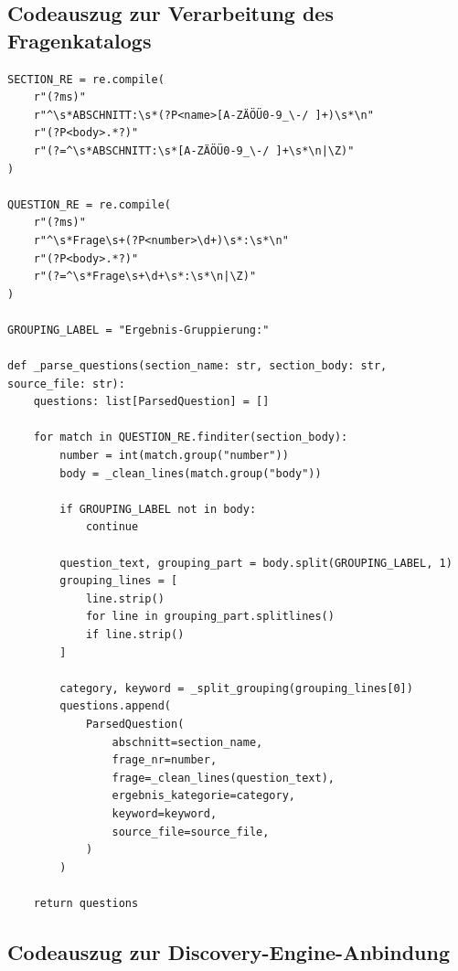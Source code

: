 \documentclass[
  10pt,
  ngerman,
  a4paper,
  toc=graduated,
  numbers=noenddot,
  headings=standardclasses,
  nonumberlist
]{scrartcl}
\begin{document}
\newpage
\subsection{Codeauszug zur Verarbeitung des Fragenkatalogs}
\label{anhang_fragen_parser}

\begin{lstlisting}[style=pythoncode, numbers=none, caption={Extraktion strukturierter Fragen aus dem Fragenkatalog}, label={lst:fragen_parser}]
SECTION_RE = re.compile(
    r"(?ms)"
    r"^\s*ABSCHNITT:\s*(?P<name>[A-ZÄÖÜ0-9_\-/ ]+)\s*\n"
    r"(?P<body>.*?)"
    r"(?=^\s*ABSCHNITT:\s*[A-ZÄÖÜ0-9_\-/ ]+\s*\n|\Z)"
)

QUESTION_RE = re.compile(
    r"(?ms)"
    r"^\s*Frage\s+(?P<number>\d+)\s*:\s*\n"
    r"(?P<body>.*?)"
    r"(?=^\s*Frage\s+\d+\s*:\s*\n|\Z)"
)

GROUPING_LABEL = "Ergebnis-Gruppierung:"

def _parse_questions(section_name: str, section_body: str, source_file: str):
    questions: list[ParsedQuestion] = []

    for match in QUESTION_RE.finditer(section_body):
        number = int(match.group("number"))
        body = _clean_lines(match.group("body"))

        if GROUPING_LABEL not in body:
            continue

        question_text, grouping_part = body.split(GROUPING_LABEL, 1)
        grouping_lines = [
            line.strip()
            for line in grouping_part.splitlines()
            if line.strip()
        ]

        category, keyword = _split_grouping(grouping_lines[0])
        questions.append(
            ParsedQuestion(
                abschnitt=section_name,
                frage_nr=number,
                frage=_clean_lines(question_text),
                ergebnis_kategorie=category,
                keyword=keyword,
                source_file=source_file,
            )
        )

    return questions
\end{lstlisting}

\newpage
\subsection{Codeauszug zur Discovery-Engine-Anbindung}
\label{anhang_discovery_engine}
\end{document}
